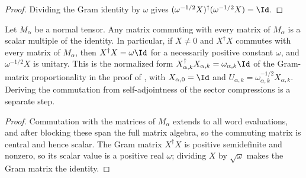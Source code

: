 \begin{proof}\leanok
    Dividing the Gram identity by $\omega$ gives
    $(\omega^{-1/2}X)^\dagger(\omega^{-1/2}X)=\Id$.
\end{proof}

\begin{lemma}
    \label{thm:normal_tensor_gram_rigidity}
    \leanok
    Let $M_\alpha$ be a normal tensor. Any matrix commuting with every
    matrix of $M_\alpha$ is a scalar multiple of the identity. In
    particular, if $X\ne 0$ and $X^\dagger X$ commutes with every matrix
    of $M_\alpha$, then $X^\dagger X=\omega\Id$ for a necessarily positive
    constant $\omega$, and $\omega^{-1/2}X$ is unitary. This is the
    normalized form
    $X_{\alpha,k}^\dagger X_{\alpha,k}=\omega_{\alpha,k}\Id$ of the
    Gram-matrix proportionality in the proof of
    \cite[Proposition~4.13]{Cirac2016MPDO_arXiv}, with
    $X_{\alpha,0}=\Id$ and
    $U_{\alpha,k}=\omega_{\alpha,k}^{-1/2}X_{\alpha,k}$. Deriving the
    commutation from self-adjointness of the sector compressions is a
    separate step.
\end{lemma}

\begin{proof}
    \leanok
    Commutation with the matrices of $M_\alpha$ extends to all word
    evaluations, and after blocking these span the full matrix algebra, so
    the commuting matrix is central and hence scalar. The Gram matrix
    $X^\dagger X$ is positive semidefinite and nonzero, so its scalar value
    is a positive real $\omega$; dividing $X$ by $\sqrt{\omega}$ makes the
    Gram matrix the identity.
\end{proof}

